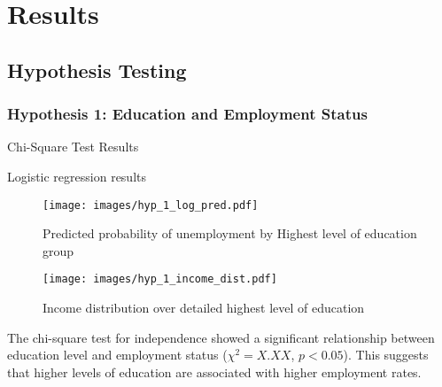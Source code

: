 \section{Results}

\subsection{Hypothesis Testing}

\subsubsection{Hypothesis 1: Education and Employment Status}

\begin{table}[H]
    \caption{Chi-Square Test Results}
    \label{tab:chi_square_results}
    \begin{minipage}{\columnwidth}
        \centering
        
    \end{minipage}
\end{table}

\begin{table}[H]
    \centering
    \scriptsize
    \caption{Logistic regression results}
    \begin{minipage}{\columnwidth}
        
    \end{minipage}
\end{table}

\begin{figure}[H]
    \centering
    \texttt{[image: images/hyp\_1\_log\_pred.pdf]} %
    \caption{Predicted probability of unemployment by Highest level of education group}
    \label{fig:predicted unemployment for highest academic level}
\end{figure}

\begin{figure}[H]
    \centering
    \texttt{[image: images/hyp\_1\_income\_dist.pdf]} %
    \caption{Income distribution over detailed highest level of education}
    \label{fig:unemployment distribution for unemployment highest academic level}
\end{figure}

The chi-square test for independence showed a significant relationship between education level and employment status ($\chi^2 = X.XX$, $p < 0.05$). This suggests that higher levels of education are associated with higher employment rates.


